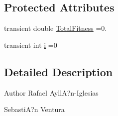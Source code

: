 \subsection*{Protected Attributes}
\begin{DoxyCompactItemize}
\item 
transient double \hyperlink{classnet_1_1sf_1_1jclec_1_1selector_1_1_stochastic_remaining_selector_a7ea1d65cd528ca92497a80841c9091e8}{Total\-Fitness} =0.
\item 
transient int \hyperlink{classnet_1_1sf_1_1jclec_1_1selector_1_1_stochastic_remaining_selector_ab2a1af3f6c09d075bb8795f8e5fa42d1}{i} =0
\end{DoxyCompactItemize}


\subsection{Detailed Description}
\begin{DoxyAuthor}{Author}
Rafael Ayll\-A?n-\/\-Iglesias 

Sebasti\-A?n Ventura 
\end{DoxyAuthor}


